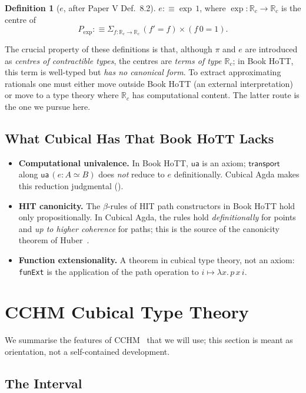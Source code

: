 \documentclass[12pt]{article}
\theoremstyle{definition}
\newtheorem{definition}[theorem]{Definition}
\theoremstyle{remark}
\newcommand{\Rc}{\mathbb{R}_{c}}
\newcommand{\transport}{\mathsf{transport}}
\newcommand{\ua}{\mathsf{ua}}
\newcommand{\eqv}{\simeq}
\begin{document}
\begin{definition}[$e$, after Paper V Def.~8.2]
\label{def:e}
$e :\equiv \exp\,1$, where $\exp : \Rc \to \Rc$ is the centre of
\[
P_{\exp} :\equiv
\Sigma_{f : \Rc \to \Rc}\,
 (f' = f) \times (f\,0 = 1).
\]
\end{definition}

The crucial property of these definitions is that, although $\pi$ and $e$
are introduced as \emph{centres of contractible types}, the centres are
\emph{terms of type $\Rc$}; in Book HoTT, this term is well-typed but
\emph{has no canonical form}. To extract approximating rationals one must
either move outside Book HoTT (an external interpretation) or move to a
type theory where $\Rc$ has computational content. The latter route is
the one we pursue here.

\subsection{What Cubical Has That Book HoTT Lacks}

\begin{itemize}
\item \textbf{Computational univalence.} In Book HoTT, $\ua$ is an axiom;
$\transport$ along $\ua\,(e : A \eqv B)$ does \emph{not} reduce to
$e$ definitionally. Cubical Agda makes this reduction judgmental
(\cite[Thm.~7.2]{Paper05HoTT}).
\item \textbf{HIT canonicity.} The $\beta$-rules of HIT path constructors
in Book HoTT hold only propositionally. In Cubical Agda, the rules hold
\emph{definitionally} for points and \emph{up to higher coherence} for
paths; this is the source of the canonicity theorem of Huber~\cite{Huber}.
\item \textbf{Function extensionality.} A theorem in cubical type theory,
not an axiom: \texttt{funExt} is the application of the path operation to
$i \mapsto \lambda x.\, p\,x\,i$.
\end{itemize}

\section{CCHM Cubical Type Theory}
\label{sec:cchm}

We summarise the features of CCHM~\cite{CCHM} that we will use; this
section is meant as orientation, not a self-contained development.

\subsection{The Interval}
\end{document}
